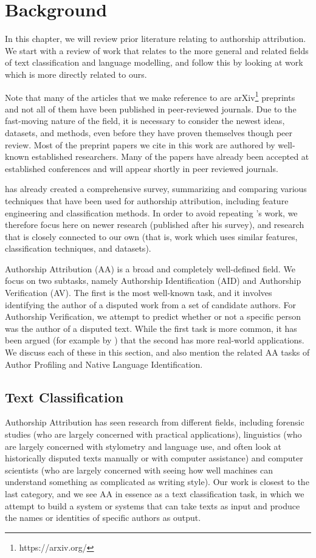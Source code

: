 \chapter{Background}\label{chap:back}

In this chapter, we will review prior literature relating to authorship attribution. We start with a review of work that relates to the more general and related fields of text classification and language modelling, and follow this by looking at work which is more directly related to ours.

Note that many of the articles that we make reference to are arXiv\footnote{https://arxiv.org/} preprints and not all of them have been published in peer-reviewed journals. Due to the fast-moving nature of the field, it is necessary to consider the newest ideas, datasets, and methods, even before they have proven themselves though peer review. Most of the preprint papers we cite in this work are authored by well-known established researchers. Many of the papers have already been accepted at established conferences and will appear shortly in peer reviewed journals.

\citet{stamatatos2009survey} has already created a comprehensive survey, summarizing and comparing various techniques that have been used for authorship attribution, including feature engineering and classification methods. In order to avoid repeating \citeauthor{stamatatos2009survey}'s work, we therefore focus here on newer research (published after his survey), and research that is closely connected to our own (that is, work which uses similar features, classification techniques, and datasets).

Authorship Attribution (AA) is a broad and completely well-defined field. We focus on two subtasks, namely Authorship Identification (AID) and Authorship Verification (AV). The first is the most well-known task, and it involves identifying the author of a disputed work from a set of candidate authors. For Authorship Verification, we attempt to predict whether or not a specific person was the author of a disputed text. While the first task is more common, it has been argued (for example by \citet{koppel2004authorship}) that the second has more real-world applications. We discuss each of these in this section, and also mention the related AA tasks of Author Profiling and Native Language Identification.


\section{Text Classification}
Authorship Attribution has seen research from different fields, including forensic studies (who are largely concerned with practical applications), linguistics (who are largely concerned with stylometry and language use, and often look at historically disputed texts manually or with computer assistance) and computer scientists (who are largely concerned with seeing how well machines can understand something as complicated as writing style). Our work is closest to the last category, and we see AA in essence as a text classification task, in which we attempt to build a system or systems that can take texts as input and produce the names or identities of specific authors as output.

